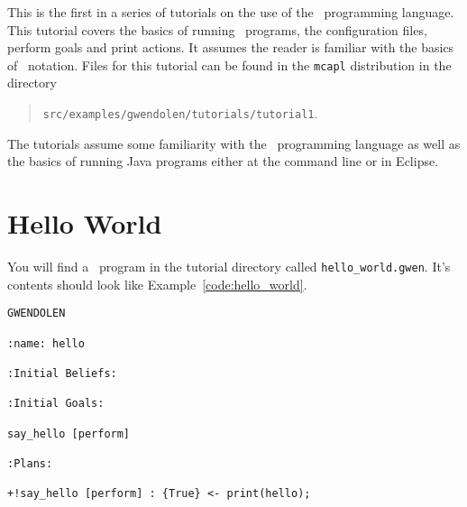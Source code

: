 
This is the first in a series of tutorials on the use of the \gwendolen\ programming language.  This tutorial covers the basics of running \gwendolen\ programs, the configuration files, perform goals and print actions.  It assumes the reader is familiar with the basics of \prolog\ notation.
Files for this tutorial can be found in the
\texttt{mcapl} distribution in the directory
\begin{quote}
\texttt{src/examples/gwendolen/tutorials/tutorial1}.
\end{quote}
%
The tutorials assume some familiarity with the \prolog\ programming language as well as the basics of running Java programs either at the command line or in Eclipse.

\section{Hello World}

You will find a \gwendolen\ program in the tutorial directory called \texttt{hello\_world.gwen}.  It's contents should look like Example~\ref{code:hello_world}.
\begin{ourexample}
\label{code:hello_world}
\begin{lstlisting}[basicstyle=\footnotesize\sffamily,language=Gwendolen]
GWENDOLEN

:name: hello

:Initial Beliefs:

:Initial Goals:

say_hello [perform]

:Plans:

+!say_hello [perform] : {True} <- print(hello);
\end{lstlisting}
\end{ourexample}

